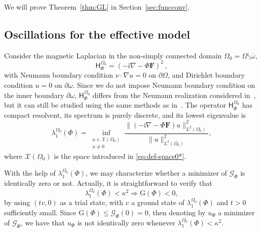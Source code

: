 \documentclass[11pt]{amsart}
\newcommand{\Hf}{\mathsf{H}_{\Phi}^{\Omega_0}}
\newcommand{\Fb}{\mathbf F}
\newcommand{\ii}{\mathrm i}
\newcommand{\Gf}{\mathcal G_\Phi}
\newcommand{\Gn}{\mathrm G(\Phi)}
\newcommand{\cX}{\mathcal X}
\theoremstyle{definition}
\numberwithin{equation}{section}
\begin{document}
We will prove Theorem~\ref{thm:GL} in Section~\ref{sec:funcconv}.

\subsection{Oscillations for the effective model}
%
Consider the magnetic Laplacian in the non-simply connected domain $\Omega_0=\Omega\setminus\overline{\omega}$,
\begin{equation}\label{eq:def-op-fl}
\Hf=(-\ii\nabla-\Phi\Fb)^2\,,
\end{equation}
with Neumann boundary condition
$\nu\cdot \nabla u=0$ on $\partial\Omega$, and Dirichlet boundary condition $u=0$ on $\partial\omega$.
 Since we do not impose Neumann boundary condition on the inner boundary \(\partial\omega\), \(\Hf\) differs from the Neumann realization  considered in~\cite{HHOO}, but it can still be studied using the same methods as in~\cite{HHOO}.
The operator $\Hf$ has compact resolvent, its spectrum is purely discrete, and its lowest eigenvalue is
\begin{equation}\label{eq:def-ev-Hf}
\lambda_1^{\Omega_0}(\Phi)=\inf_{\substack{u\in \cX(\Omega_0)\\u\not=0}}\frac{\|(-\ii\nabla-\Phi\Fb)u\|^2_{L^2(\Omega_0)}}{\|u\|^2_{L^2(\Omega_0)}},
\end{equation}
where $\cX(\Omega_0)$ is the space introduced in \eqref{eq:def-space0*}.

With the help of $\lambda_1^{\Omega_0}(\Phi)$, we may characterize whether a minimizer of $\Gf$ is identically zero or not.  Actually, it is straightforward to verify that
\begin{equation}\label{eq:criterion}
\lambda_1^{\Omega_0}(\Phi)<\kappa^2\Longrightarrow\Gn<0,
\end{equation}
by using $(tv,0)$ as a trial state, with $v$ a ground state of $\lambda_1^{\Omega_0}(\Phi)$ and $t>0$ sufficiently small.
Since $\Gn\leq \Gf(0)=0$, then denoting by $u_\Phi$ a minimizer of $\Gf$, we have that $u_\Phi$  is not identically zero whenever $\lambda_1^{\Omega_0}(\Phi)<\kappa^2$.
%
\end{document}
